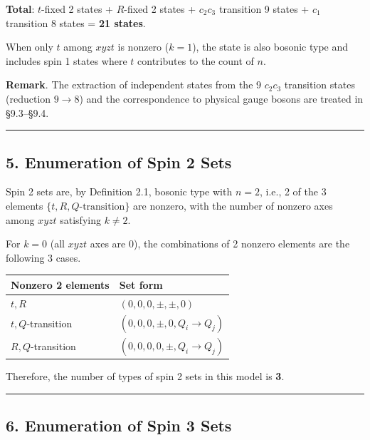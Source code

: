 \documentclass[
  a4paper,11pt]{article}
\newcounter{none}
\theoremstyle{definition}
\theoremstyle{remark}
\begin{document}
\textbf{Total}: \(t\)-fixed 2 states + \(R\)-fixed 2 states +
\(c_2 c_3\) transition 9 states + \(c_1\) transition 8 states =
\textbf{21 states}.

When only \(t\) among \(xyzt\) is nonzero (\(k = 1\)), the state is also
bosonic type and includes spin 1 states where \(t\) contributes to the
count of \(n\).

\textbf{Remark}. The extraction of independent states from the 9
\(c_2 c_3\) transition states (reduction \(9 \to 8\)) and the
correspondence to physical gauge bosons are treated in §9.3--§9.4.

\begin{center}\rule{0.5\linewidth}{0.5pt}\end{center}

\subsection{5. Enumeration of Spin 2
Sets}\label{enumeration-of-spin-2-sets}

Spin 2 sets are, by Definition 2.1, bosonic type with \(n = 2\), i.e., 2
of the 3 elements \(\{t, R, Q\text{-transition}\}\) are nonzero, with
the number of nonzero axes among \(xyzt\) satisfying \(k \neq 2\).

For \(k = 0\) (all \(xyzt\) axes are \(0\)), the combinations of 2
nonzero elements are the following 3 cases.

{\def\LTcaptype{none} %
\begin{longtable}[]{@{}ll@{}}
\toprule\noalign{}
Nonzero 2 elements & Set form \\
\midrule\noalign{}
\endhead
\bottomrule\noalign{}
\endlastfoot
\(t, R\) & \((0, 0, 0, \pm, \pm, 0)\) \\
\(t, Q\)-transition & \((0, 0, 0, \pm, 0, Q_i \to Q_j)\) \\
\(R, Q\)-transition & \((0, 0, 0, 0, \pm, Q_i \to Q_j)\) \\
\end{longtable}
}

Therefore, the number of types of spin 2 sets in this model is
\textbf{3}.

\begin{center}\rule{0.5\linewidth}{0.5pt}\end{center}

\subsection{6. Enumeration of Spin 3
Sets}\label{enumeration-of-spin-3-sets}
\end{document}
